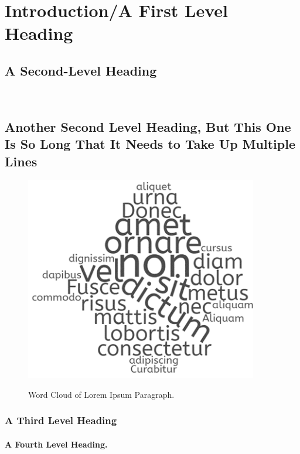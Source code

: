 
\chapter{Introduction/A First Level Heading}
\section{A Second-Level Heading}

\lipsum[35]\\ 

\lipsum[26]


\section{Another Second Level Heading, But This One Is So Long That It Needs to Take Up Multiple Lines}
\lipsum[45]

\vspace{2\baselineskip}
\begin{figure}[htb!]
    \caption{Word Cloud of Lorem Ipsum Paragraph.}
    
    \includegraphics[width = 4in]{Figures/word_cloud.png}
    \label{fig: word cloud}
\end{figure}
\FloatBarrier
\vspace{\baselineskip}

\lipsum[78]

\subsection{A Third Level Heading}

\lipsum[2]

\subsubsection{A Fourth Level Heading.}\lipsum[9]

